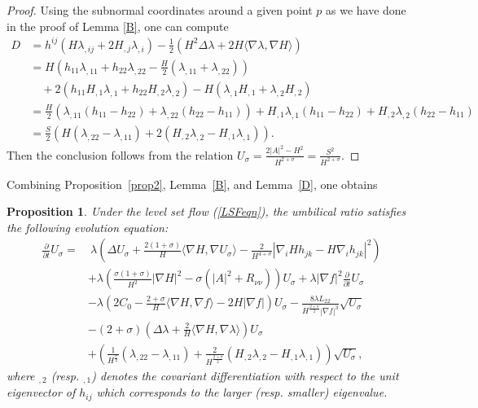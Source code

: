 \documentclass[12pt,a4paper]{amsart}
\newtheorem{Prop}{Proposition}
\begin{document}
\begin{proof}
Using the subnormal coordinates around a given point $p$ as we have done in the proof of Lemma \ref{B}, one can compute
\begin{align*}
D&=h^{ij}(H\lambda_{,ij}+2H_{,j}\lambda_{,i})-\frac{1}{2}(H^2\Delta\lambda+2H\langle\nabla\lambda,\nabla H\rangle)\\
 &=H\left(h_{11}\lambda_{,11}+h_{22}\lambda_{,22}  -\frac{H}{2}( \lambda_{,11} +\lambda_{,22} )\right)\\
 &\quad+2(h_{11}H_{,1}\lambda_{,1}+h_{22}H_{,2}\lambda_{,2})-H(\lambda_{,1}H_{,1}+\lambda_{,2}H_{,2})\\
 &=\frac{H}{2}\left(\lambda_{,11}(h_{11}-h_{22})+\lambda_{,22}(h_{22}-h_{11})\right)+H_{,1}\lambda_{,1}(h_{11}-h_{22})  + H_{,2}\lambda_{,2}(h_{22}-h_{11})\\
 &=\frac{S}{2}\left(H(\lambda_{,22}-\lambda_{,11})+2(H_{,2}\lambda_{,2}-H_{,1}\lambda_{,1})\right).
\end{align*}
Then  the conclusion follows from the relation $U_\sigma=\frac{2|A|^2-H^2}{H^{2+\sigma}}=\frac{S^2}{H^{2+\sigma}}$.
\end{proof}

Combining Proposition~\ref{prop2}, Lemma~\ref{B}, and Lemma~\ref{D}, one obtains
\begin{Prop}\label{prop3}
Under the level set flow (\ref{LSFeqn}),
the umbilical ratio satisfies the following evolution equation:
\begin{align*}
\frac{\partial}{\partial t}U_\sigma
=&\ \lambda\left(\Delta U_{\sigma}+\frac{2(1+\sigma)}{H}\langle\nabla H,\nabla U_{\sigma}\rangle
 -\frac{2}{H^{4+\sigma}}|\nabla_iHh_{jk}-H\nabla_ih_{jk}|^2\right) \\
&+\lambda\left(\frac{\sigma(1+\sigma)}{H^2}|\nabla H|^2-\sigma(|A|^2+R_{\nu\nu})\right)U_\sigma+\lambda|\nabla f|^2\frac{\partial}{\partial t}U_{\sigma}\\
&-\lambda\left(2C_0-\frac{2+\sigma}{H}\langle\nabla H,\nabla f\rangle-2H|\nabla f|\right)U_{\sigma}
-\frac{8\lambda L_{22}}{H^{\frac{2+\sigma}{2}}|\nabla f|^{3}}\sqrt{U_\sigma} \\
&-(2+\sigma)\left(\Delta\lambda+\frac{2}{H}\langle\nabla H,\nabla\lambda\rangle\right)U_{\sigma} \\
&+\left(\frac{1}{H^{\frac{\sigma}{2}}}(\lambda_{,22}-\lambda_{,11})+\frac{2}{H^{\frac{2+\sigma}{2}}}(H_{,2}\lambda_{,2}-H_{,1}\lambda_{,1})\right)\sqrt{U_\sigma},
\end{align*}
where $_{,2}$ (resp. $_{,1}$) denotes the covariant differentiation with respect to the unit eigenvector of $h_{ij}$
which corresponds to the larger (resp. smaller) eigenvalue.
\end{Prop}
\end{document}
